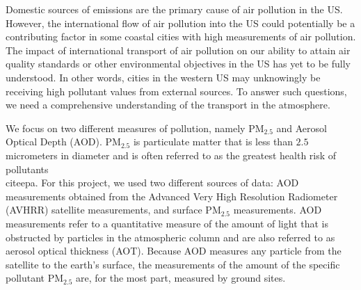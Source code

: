 \documentclass[10pt]{article}
\begin{document}
Domestic sources of emissions are the primary cause of air pollution in the
US. However, the international flow of air pollution into
the US could potentially be a contributing factor in some coastal cities with 
high measurements of air pollution. The impact of international transport of
air pollution on our ability to attain air quality standards or other
environmental objectives in the US has yet to be fully understood. In
other words, cities in the western US may unknowingly be receiving high
pollutant values from external sources. {To answer such questions, 
we need a comprehensive understanding of the transport in the
atmosphere.  }



{We focus on two different measures of pollution, namely PM$_{2.5}$ and Aerosol
Optical Depth (AOD).} PM$_{2.5}$ is particulate matter that is less than $2.5$
micrometers in diameter and is often referred to as the greatest health risk of
pollutants~\\cite{epa}. For this project, we used two different sources of data: 
{AOD} measurements obtained from the Advanced Very High Resolution
Radiometer (AVHRR) satellite measurements, and surface PM$_{2.5}$ measurements.
AOD measurements refer to a quantitative measure of the amount of light that is
obstructed by particles in the atmospheric column and are also referred to as
aerosol optical thickness (AOT). Because AOD measures any particle from the
satellite to the earth's surface, the measurements of the amount of the
specific pollutant PM$_{2.5}$ are, for the most part, measured by ground sites.
\end{document}
